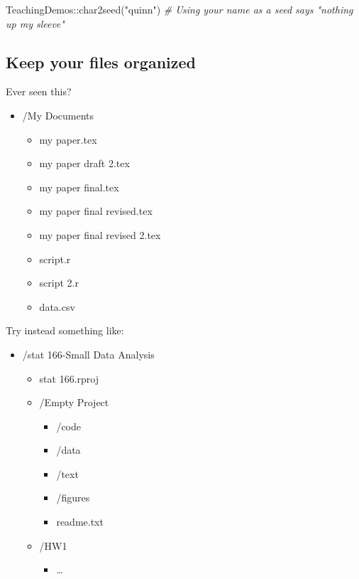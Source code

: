 \documentclass[
  letterpaper,
  DIV=11,
  numbers=noendperiod]{scrreprt}
\newenvironment{Shaded}{\begin{snugshade}}{\end{snugshade}}
\newcommand{\CommentTok}[1]{\textcolor[rgb]{0.38,0.63,0.69}{\textit{#1}}}
\newcommand{\FunctionTok}[1]{\textcolor[rgb]{0.02,0.16,0.49}{#1}}
\newcommand{\NormalTok}[1]{\textcolor[rgb]{0.00,0.44,0.13}{#1}}
\newcommand{\SpecialCharTok}[1]{\textcolor[rgb]{0.25,0.44,0.63}{#1}}
\newcommand{\StringTok}[1]{\textcolor[rgb]{0.25,0.44,0.63}{#1}}
\providecommand{\tightlist}{%
  \setlength{\itemsep}{0pt}\setlength{\parskip}{0pt}}\usepackage{longtable,booktabs,array}
\begin{document}
\begin{Shaded}
\begin{Highlighting}[]
\NormalTok{TeachingDemos}\SpecialCharTok{::}\FunctionTok{char2seed}\NormalTok{(}\StringTok{"quinn"}\NormalTok{) }
\CommentTok{\# Using your name as a seed says "nothing up my sleeve"}
\end{Highlighting}
\end{Shaded}

\hypertarget{keep-your-files-organized}{%
\subsection{Keep your files organized}\label{keep-your-files-organized}}

Ever seen this?

\begin{itemize}
\tightlist
\item
  /My Documents

  \begin{itemize}
  \tightlist
  \item
    my paper.tex
  \item
    my paper draft 2.tex
  \item
    my paper final.tex
  \item
    my paper final revised.tex
  \item
    my paper final revised 2.tex
  \item
    script.r
  \item
    script 2.r
  \item
    data.csv
  \end{itemize}
\end{itemize}

Try instead something like:

\begin{itemize}
\tightlist
\item
  /stat 166-Small Data Analysis

  \begin{itemize}
  \tightlist
  \item
    stat 166.rproj
  \item
    /Empty Project

    \begin{itemize}
    \tightlist
    \item
      /code
    \item
      /data
    \item
      /text
    \item
      /figures
    \item
      readme.txt
    \end{itemize}
  \item
    /HW1

    \begin{itemize}
    \tightlist
    \item
      \ldots{}
    \end{itemize}
  \end{itemize}
\end{itemize}
\end{document}
